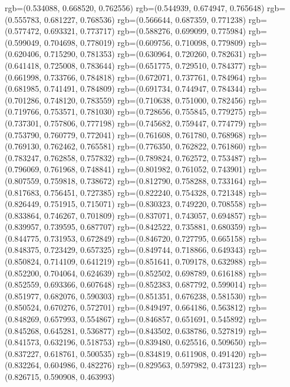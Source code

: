 {{{					rgb=(0.534088, 0.668520, 0.762556)
					rgb=(0.544939, 0.674947, 0.765648)
					rgb=(0.555783, 0.681227, 0.768536)
					rgb=(0.566644, 0.687359, 0.771238)
					rgb=(0.577472, 0.693321, 0.773717)
					rgb=(0.588276, 0.699099, 0.775984)
					rgb=(0.599049, 0.704698, 0.778019)
					rgb=(0.609756, 0.710098, 0.779809)
					rgb=(0.620406, 0.715290, 0.781353)
					rgb=(0.630964, 0.720260, 0.782631)
					rgb=(0.641418, 0.725008, 0.783644)
					rgb=(0.651775, 0.729510, 0.784377)
					rgb=(0.661998, 0.733766, 0.784818)
					rgb=(0.672071, 0.737761, 0.784964)
					rgb=(0.681985, 0.741491, 0.784809)
					rgb=(0.691734, 0.744947, 0.784344)
					rgb=(0.701286, 0.748120, 0.783559)
					rgb=(0.710638, 0.751000, 0.782456)
					rgb=(0.719766, 0.753571, 0.781030)
					rgb=(0.728656, 0.755845, 0.779275)
					rgb=(0.737301, 0.757806, 0.777198)
					rgb=(0.745682, 0.759447, 0.774779)
					rgb=(0.753790, 0.760779, 0.772041)
					rgb=(0.761608, 0.761780, 0.768968)
					rgb=(0.769130, 0.762462, 0.765581)
					rgb=(0.776350, 0.762822, 0.761860)
					rgb=(0.783247, 0.762858, 0.757832)
					rgb=(0.789824, 0.762572, 0.753487)
					rgb=(0.796069, 0.761968, 0.748841)
					rgb=(0.801982, 0.761052, 0.743901)
					rgb=(0.807559, 0.759818, 0.738672)
					rgb=(0.812790, 0.758288, 0.733164)
					rgb=(0.817683, 0.756451, 0.727385)
					rgb=(0.822240, 0.754328, 0.721348)
					rgb=(0.826449, 0.751915, 0.715071)
					rgb=(0.830323, 0.749220, 0.708558)
					rgb=(0.833864, 0.746267, 0.701809)
					rgb=(0.837071, 0.743057, 0.694857)
					rgb=(0.839957, 0.739595, 0.687707)
					rgb=(0.842522, 0.735881, 0.680359)
					rgb=(0.844775, 0.731953, 0.672849)
					rgb=(0.846720, 0.727795, 0.665158)
					rgb=(0.848375, 0.723429, 0.657325)
					rgb=(0.849744, 0.718866, 0.649343)
					rgb=(0.850824, 0.714109, 0.641219)
					rgb=(0.851641, 0.709178, 0.632988)
					rgb=(0.852200, 0.704064, 0.624639)
					rgb=(0.852502, 0.698789, 0.616188)
					rgb=(0.852559, 0.693366, 0.607648)
					rgb=(0.852383, 0.687792, 0.599014)
					rgb=(0.851977, 0.682076, 0.590303)
					rgb=(0.851351, 0.676238, 0.581530)
					rgb=(0.850524, 0.670276, 0.572701)
					rgb=(0.849497, 0.664186, 0.563812)
					rgb=(0.848269, 0.657993, 0.554867)
					rgb=(0.846857, 0.651691, 0.545892)
					rgb=(0.845268, 0.645281, 0.536877)
					rgb=(0.843502, 0.638786, 0.527819)
					rgb=(0.841573, 0.632196, 0.518753)
					rgb=(0.839480, 0.625516, 0.509650)
					rgb=(0.837227, 0.618761, 0.500535)
					rgb=(0.834819, 0.611908, 0.491420)
					rgb=(0.832264, 0.604986, 0.482276)
					rgb=(0.829563, 0.597982, 0.473123)
					rgb=(0.826715, 0.590908, 0.463993)
}}}
